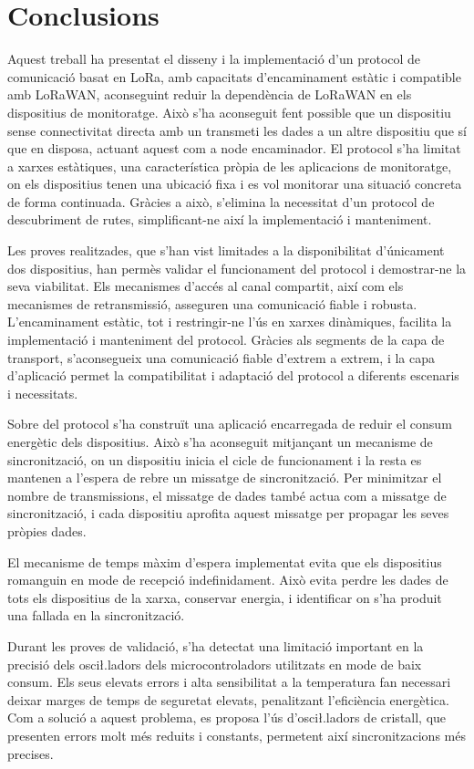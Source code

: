 \documentclass{tfgitic}[2024/07/01]
\begin{document}
{\chapter{Conclusions}
Aquest treball ha presentat el disseny i la implementació d'un protocol de comunicació basat en LoRa, amb capacitats d'encaminament estàtic i compatible amb LoRaWAN, aconseguint reduir la dependència de  LoRaWAN en els dispositius de monitoratge. Això s'ha aconseguit fent possible que un dispositiu sense connectivitat directa amb un  transmeti les dades a un altre dispositiu que sí que en disposa, actuant aquest com a node encaminador. El protocol s'ha limitat a xarxes estàtiques, una característica pròpia de les aplicacions de monitoratge, on els dispositius tenen una ubicació fixa i es vol monitorar una situació concreta de forma continuada. Gràcies a això, s'elimina la necessitat d'un protocol de descubriment de rutes, simplificant-ne així la implementació i manteniment.

Les proves realitzades, que s'han vist limitades a la disponibilitat d'únicament dos dispositius, han permès validar el funcionament del protocol i demostrar-ne la seva viabilitat. Els mecanismes d'accés al canal compartit, així com els mecanismes de retransmissió, asseguren una comunicació fiable i robusta. L'encaminament estàtic, tot i restringir-ne l'ús en xarxes dinàmiques, facilita la implementació i manteniment del protocol. Gràcies als segments de la capa de transport, s'aconsegueix una comunicació fiable d'extrem a extrem, i la capa d'aplicació permet la compatibilitat i adaptació del protocol a diferents escenaris i necessitats. 

Sobre del protocol s'ha construït una aplicació encarregada de reduir el consum energètic dels dispositius. Això s'ha aconseguit mitjançant un mecanisme de sincronització, on un dispositiu inicia el cicle de funcionament i la resta es mantenen a l'espera de rebre un missatge de sincronització. Per minimitzar el nombre de transmissions, el missatge de dades també actua com a missatge de sincronització, i cada dispositiu aprofita aquest missatge per propagar les seves pròpies dades.  

El mecanisme de temps màxim d'espera implementat evita que els dispositius romanguin en mode de recepció indefinidament. Això evita perdre les dades de tots els dispositius de la xarxa, conservar energia, i identificar on s'ha produit una fallada en la sincronització.

Durant les proves de validació, s'ha detectat una limitació important en la precisió dels osci\l.ladors dels microcontroladors utilitzats en mode de baix consum. Els seus elevats errors i alta sensibilitat a la temperatura fan necessari deixar marges de temps de seguretat elevats, penalitzant l'eficiència energètica. Com a solució a aquest problema, es proposa l'ús d'osci\l.ladors de cristall, que presenten errors molt més reduits i constants, permetent així sincronitzacions més precises.

}
\end{document}
